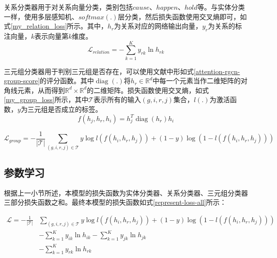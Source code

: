 关系分类器用于对关系向量分类，类别包括$cause$、$happen$、$hold$等。与实体分类一样，使用多层感知机、$softmax(.)$层分类，然后损失函数使用交叉熵即可，如式\ref{my_relation_loss}所示。其中，$h_r$为关系对应的网络输出向量，$y_r$为关系的标注向量，$k$表示向量第$k$维度。
\begin{equation}
    \mathcal{L}_{relation}=- \sum_{k=1}^{K} y_{r k} \ln h_{r k}
    \label{my_relation_loss}
\end{equation}

三元组分类器用于判别三元组是否存在，可以使用文献\parencite{trouillon2016complex}中形如式\ref{attention-rgcn-group-score}的评分函数。其中$\operatorname{diag}\left(.\right)$将$h_r\in\mathbb{R}^{d}$中每一个元素当作二维矩阵的对角线元素，从而得到$\mathbb{R}^{d}\times \mathbb{R}^{d}$的二维矩阵。损失函数使用交叉熵，如式\ref{my_group_loss}所示，其中$\mathcal{T}$表示所有的输入$(g, i, r, j)$集合，$l(.)$为激活函数，$y$为三元组是否成立的标签。
\begin{equation}
    f(h_{j}, h_{r}, h_{i})=h_{j}^{T} \operatorname{diag}\left(h_{r}\right) h_{i}
    \label{attention-rgcn-group-score}
\end{equation}

\begin{equation}
    \mathcal{L}_{group}= -\frac{1}{|\mathcal{T}|}  \sum_{(g, i, r, j) \in \mathcal{T}} y \log l(f(h_i, h_r, h_j))+(1-y) \log (1-l(f(h_i, h_r, h_j)))
    \label{my_group_loss}
\end{equation}

\subsection{参数学习}\label{representation-paras-learn}
根据上一小节所述，本模型的损失函数为实体分类器、关系分类器、三元组分类器三部分损失函数之和。最终本模型的损失函数如式\ref{represent-loss-all}所示：

\begin{equation}
    \begin{aligned}
    \mathcal{L}=-\frac{1}{|\mathcal{T}|}&  \sum_{(g, i, r, j) \in \mathcal{T}} y \log l(f(h_i, h_r, h_j))+(1-y) \log (1-l(f(h_i, h_r, h_j)))\\
    &- \sum_{k=1}^{K} y_{i k} \ln h_{i k} - \sum_{k=1}^{K} y_{j k} \ln h_{j k}\\
    &- \sum_{k=1}^{K} y_{r k} \ln h_{r k}\\
    \end{aligned}
    \label{represent-loss-all}
\end{equation}


